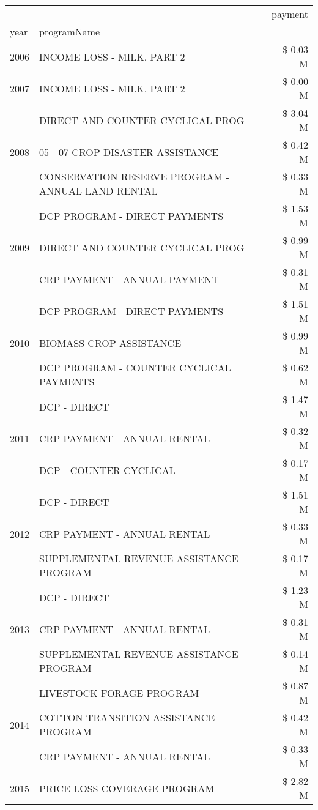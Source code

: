 \begin{tabular}{llr}
\toprule
 &  & payment \\
year & programName &  \\
\midrule
2006 & INCOME LOSS - MILK, PART 2 & \$ 0.03 M \\
\cline{1-3}
2007 & INCOME LOSS - MILK, PART 2 & \$ 0.00 M \\
\cline{1-3}
\multirow[t]{3}{*}{2008} & DIRECT AND COUNTER CYCLICAL PROG & \$ 3.04 M \\
 & 05 - 07 CROP DISASTER ASSISTANCE & \$ 0.42 M \\
 & CONSERVATION RESERVE PROGRAM - ANNUAL LAND RENTAL & \$ 0.33 M \\
\cline{1-3}
\multirow[t]{3}{*}{2009} & DCP PROGRAM - DIRECT PAYMENTS & \$ 1.53 M \\
 & DIRECT AND COUNTER CYCLICAL PROG & \$ 0.99 M \\
 & CRP PAYMENT - ANNUAL PAYMENT & \$ 0.31 M \\
\cline{1-3}
\multirow[t]{3}{*}{2010} & DCP PROGRAM - DIRECT PAYMENTS & \$ 1.51 M \\
 & BIOMASS CROP ASSISTANCE & \$ 0.99 M \\
 & DCP PROGRAM - COUNTER CYCLICAL PAYMENTS & \$ 0.62 M \\
\cline{1-3}
\multirow[t]{3}{*}{2011} & DCP - DIRECT & \$ 1.47 M \\
 & CRP PAYMENT - ANNUAL RENTAL & \$ 0.32 M \\
 & DCP - COUNTER CYCLICAL & \$ 0.17 M \\
\cline{1-3}
\multirow[t]{3}{*}{2012} & DCP - DIRECT & \$ 1.51 M \\
 & CRP PAYMENT - ANNUAL RENTAL & \$ 0.33 M \\
 & SUPPLEMENTAL REVENUE ASSISTANCE PROGRAM & \$ 0.17 M \\
\cline{1-3}
\multirow[t]{3}{*}{2013} & DCP - DIRECT & \$ 1.23 M \\
 & CRP PAYMENT - ANNUAL RENTAL & \$ 0.31 M \\
 & SUPPLEMENTAL REVENUE ASSISTANCE PROGRAM & \$ 0.14 M \\
\cline{1-3}
\multirow[t]{3}{*}{2014} & LIVESTOCK FORAGE PROGRAM & \$ 0.87 M \\
 & COTTON TRANSITION ASSISTANCE PROGRAM & \$ 0.42 M \\
 & CRP PAYMENT - ANNUAL RENTAL & \$ 0.33 M \\
\cline{1-3}
\multirow[t]{3}{*}{2015} & PRICE LOSS COVERAGE PROGRAM & \$ 2.82 M \\

\end{tabular}
